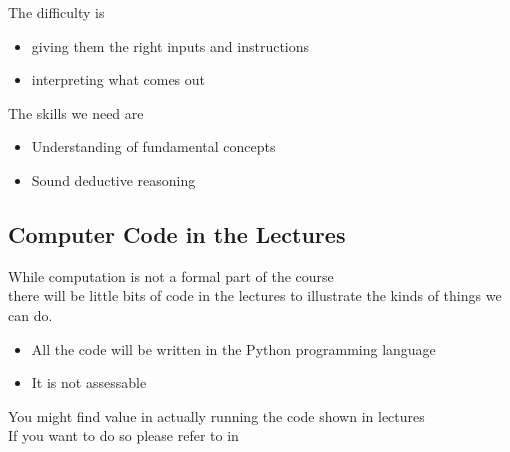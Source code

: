 \documentclass[letterpaper,10pt,english]{jupyterBook}
\begin{document}
\sphinxAtStartPar
The difficulty is
\begin{itemize}
\item {} 
\sphinxAtStartPar
giving them the right inputs and instructions

\item {} 
\sphinxAtStartPar
interpreting what comes out

\end{itemize}

\sphinxAtStartPar
The skills we need are
\begin{itemize}
\item {} 
\sphinxAtStartPar
Understanding of fundamental concepts

\item {} 
\sphinxAtStartPar
Sound deductive reasoning

\end{itemize}

\sphinxAtStartPar
{}


\subsection{Computer Code in the Lectures}
\label{\detokenize{02.optimization_intro:computer-code-in-the-lectures}}
\sphinxAtStartPar
While computation is not a formal part of the course\\
there will be little bits of code in the lectures to illustrate the kinds of things we can do.
\begin{itemize}
\item {} 
\sphinxAtStartPar
All the code will be written in the Python programming language

\item {} 
\sphinxAtStartPar
It is not assessable

\end{itemize}

\sphinxAtStartPar
You might find value in actually running the code shown in lectures\\
If you want to do so please refer to  in 
\end{document}
